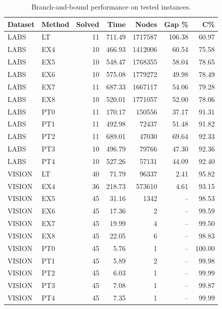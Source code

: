 \begin{table}[t]
\centering
\caption{Branch-and-bound performance on tested instances.}
\label{tab:bb-main-final-candidate}
\begin{tabular}{llrrrrr}
\toprule
Dataset & Method & Solved & Time & Nodes & Gap \% & C\% \\
\midrule
LABS & LT & 11 & 711.49 & 1717587 & 106.38 & 60.97 \\
LABS & EX4 & 10 & 466.93 & 1412006 & 60.54 & 75.58 \\
LABS & EX5 & 10 & 548.47 & 1768355 & 58.04 & 78.65 \\
LABS & EX6 & 10 & 575.08 & 1779272 & 49.98 & 78.49 \\
LABS & EX7 & 11 & 687.33 & 1667117 & 54.06 & 79.28 \\
LABS & EX8 & 10 & 520.01 & 1771057 & 52.00 & 78.06 \\
LABS & PT0 & 11 & 170.17 & 150556 & 37.17 & 91.31 \\
LABS & PT1 & 11 & 492.98 & 72437 & 51.48 & 91.82 \\
LABS & PT2 & 11 & 689.01 & 47030 & 69.64 & 92.33 \\
LABS & PT3 & 10 & 496.79 & 79766 & 47.30 & 92.36 \\
LABS & PT4 & 10 & 527.26 & 57131 & 44.09 & 92.40 \\
\addlinespace
VISION & LT & 40 & 71.79 & 96337 & 2.41 & 95.82 \\
VISION & EX4 & 36 & 218.73 & 573610 & 4.61 & 93.15 \\
VISION & EX5 & 45 & 31.16 & 1342 & -- & 98.53 \\
VISION & EX6 & 45 & 17.36 & 2 & -- & 99.59 \\
VISION & EX7 & 45 & 19.99 & 4 & -- & 99.50 \\
VISION & EX8 & 45 & 22.05 & 6 & -- & 98.83 \\
VISION & PT0 & 45 & 5.76 & 1 & -- & 100.00 \\
VISION & PT1 & 45 & 5.89 & 2 & -- & 99.98 \\
VISION & PT2 & 45 & 6.03 & 1 & -- & 99.99 \\
VISION & PT3 & 45 & 7.08 & 1 & -- & 99.87 \\
VISION & PT4 & 45 & 7.35 & 1 & -- & 99.99 \\
\bottomrule
\end{tabular}
\end{table}
